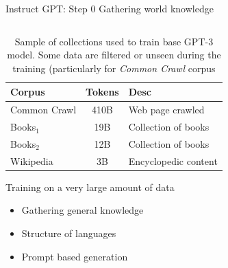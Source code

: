 \documentclass[10pt,aspectratio=169]{beamer}
\begin{document}
\begin{frame}{Instruct GPT: Step 0 Gathering world knowledge}

    \begin{columns}
        \begin{column}{0.5\textwidth}
            \begin{table}[]
                \centering
                \footnotesize
                \begin{tabular}{l|c|p{2.8cm}}
                    Corpus & Tokens & Desc \\
                    \hline
                    Common Crawl & 410B &  Web page crawled \\
                    Books$_1$ & 19B & Collection of books \\
                    Books$_2$ & 12B & Collection of books \\
                    Wikipedia & 3B & Encyclopedic content
                \end{tabular}
                \caption{Sample of collections used to train base GPT-3 model. Some data are filtered or unseen during the training (particularly for \textit{Common Crawl} corpus}
                \label{tab:gpt3-corpus}
            \end{table}
            \begin{alertblock}{Training on a very large amount of data}
        
                \begin{itemize}
                    \item Gathering general knowledge
                    \item Structure of languages
                    \item Prompt based generation
                \end{itemize}

            \end{alertblock}

        \end{column}
        \begin{column}{0.5\textwidth}  %
            \begin{alertblock}{}
        

\end{alertblock}
\end{column}
\end{columns}
\end{frame}
\end{document}

